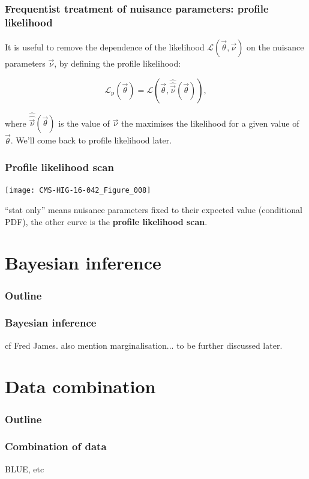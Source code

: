 \documentclass[9pt]{beamer}
\begin{document}
\begin{frame}
 \frametitle{Frequentist treatment of nuisance parameters: profile likelihood}
 
 It is useful to remove the dependence of the likelihood $\mathcal{L}(\vec{\theta},\vec{\nu})$ on the nuisance parameters $\vec{\nu}$, by defining the profile likelihood:
 
 $$\mathcal{L}_\text{p}(\vec{\theta}) = \mathcal{L}(\vec{\theta},\hat{\hat{\vec{\nu}}}(\vec{\theta})),$$
 
 where $\hat{\hat{\vec{\nu}}}(\vec{\theta})$ is the value of $\vec{\nu}$
 the maximises the likelihood for a given value of $\vec{\theta}$. We'll come back to profile likelihood later.
\end{frame}

\begin{frame}
 \frametitle{Profile likelihood scan}
 
 \begin{center}
  \texttt{[image: CMS-HIG-16-042\_Figure\_008]}
 \end{center}
 
 ``stat only'' means nuisance parameters fixed to their expected value (conditional PDF), the other curve is the \textbf{profile likelihood scan}.

\end{frame}


\section{Bayesian inference}

\begin{frame}
 \frametitle{Outline}
 
 \tableofcontents[current]
\end{frame}

\begin{frame}
 \frametitle{Bayesian inference}
 
 cf Fred James. also mention marginalisation... to be further discussed later.
\end{frame}



\section{Data combination}

\begin{frame}
 \frametitle{Outline}
 
 \tableofcontents[current]
\end{frame}


\begin{frame}
 \frametitle{Combination of data}
 
 BLUE, etc
\end{frame}
\end{document}
